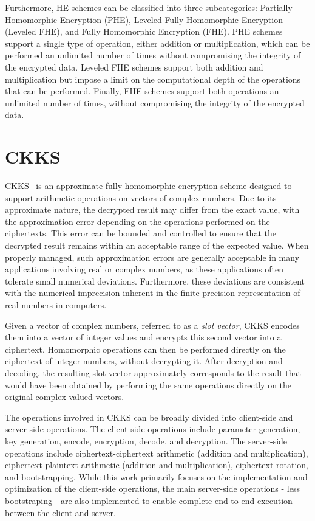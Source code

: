 Furthermore, HE schemes can be classified into three subcategories: Partially Homomorphic Encryption (PHE), Leveled Fully Homomorphic Encryption (Leveled FHE), and Fully Homomorphic Encryption (FHE). PHE schemes support a single type of operation, either addition or multiplication, which can be performed an unlimited number of times without compromising the integrity of the encrypted data. Leveled FHE schemes support both addition and multiplication but impose a limit on the computational depth of the operations that can be performed. Finally, FHE schemes support both operations an unlimited number of times, without compromising the integrity of the encrypted data.

\section{CKKS}

CKKS~\cite{cheon2017homomorphic} is an approximate  fully homomorphic encryption scheme designed to support arithmetic operations on vectors of complex numbers. Due to its approximate nature, the decrypted result may differ from the exact value, with the approximation error depending on the operations performed on the ciphertexts. This error can be bounded and controlled to ensure that the decrypted result remains within an acceptable range of the expected value. When properly managed, such approximation errors are generally acceptable in many applications involving real or complex numbers, as these applications often tolerate small numerical deviations. Furthermore, these deviations are consistent with the numerical imprecision inherent in the finite-precision representation of real numbers in computers.

Given a vector of complex numbers, referred to as a \emph{slot vector}, CKKS encodes them into a vector of integer values and encrypts this second vector into a ciphertext. Homomorphic operations can then be performed directly on the ciphertext of integer numbers, without decrypting it. After decryption and decoding, the resulting slot vector approximately corresponds to the result that would have been obtained by performing the same operations directly on the original complex-valued vectors.

The operations involved in CKKS can be broadly divided into client-side and server-side operations. The client-side operations include parameter generation, key generation, encode, encryption, decode, and decryption. The server-side operations include ciphertext-ciphertext arithmetic (addition and multiplication), ciphertext-plaintext arithmetic (addition and multiplication), ciphertext rotation, and bootstrapping. While this work primarily focuses on the implementation and optimization of the client-side operations, the main server-side operations - less bootstraping - are also implemented to enable complete end-to-end execution between the client and server.

